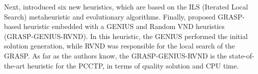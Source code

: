 \documentclass{singlecol-new}
\providecommand{\DIFdelbegin}{} %
\begin{document}
Next, \citet{silva2009problema} introduced  six new heuristics,  which are based on the ILS (Iterated Local Search) metaheuristic and evolutionary algorithms. Finally, \citet{daSilva} proposed GRASP-based heuristic embedded with a GENIUS \citep{genius} and Random VND \citep{mladenovic12} heuristics (GRASP-GENIUS-RVND). In this heuristic, the GENIUS performed the initial solution generation, while RVND was responsible for the local search of the GRASP. As far as the authors know, the GRASP-GENIUS-RVND is the state-of-the-art heuristic for the PCCTP, in terms of quality solution and CPU time.


\DIFdelbegin %



\end{document}
